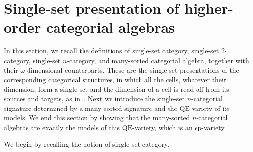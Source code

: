 \documentclass[a4paper, reqno
]{amsart}
\newcommand{\QE}{\mathrm{QE}}
\theoremstyle{plain}
\theoremstyle{definition}
\begin{document}
\section{Single-set presentation of higher-order categorial algebras}\label{SSingleSet}

In this section, we recall the definitions of single-set category, single-set $2$-category, single-set $n$-category, and many-sorted categorial algebra, together with their $\omega$-dimensional counterparts.
These are the single-set presentations of the corresponding categorical structures, in which all the cells, whatever their dimension, form a single set and the dimension of a cell is read off from its sources and targets, as in~\cite{Str87}.
Next we introduce the single-set $n$-categorial signature determined by a many-sorted signature and the $\QE$-variety of its models.
We end this section by showing that the many-sorted $n$-categorial algebras are exactly the models of this $\QE$-variety, which is an ep-variety.

We begin by recalling the notion of single-set category.
\end{document}
